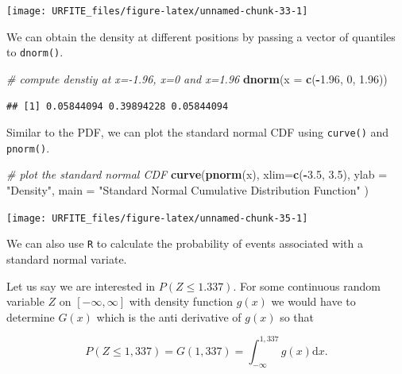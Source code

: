 \documentclass[]{book}
\newenvironment{Shaded}{\begin{snugshade}}{\end{snugshade}}
\newcommand{\KeywordTok}[1]{\textcolor[rgb]{0.13,0.29,0.53}{\textbf{#1}}}
\newcommand{\DataTypeTok}[1]{\textcolor[rgb]{0.13,0.29,0.53}{#1}}
\newcommand{\DecValTok}[1]{\textcolor[rgb]{0.00,0.00,0.81}{#1}}
\newcommand{\FloatTok}[1]{\textcolor[rgb]{0.00,0.00,0.81}{#1}}
\newcommand{\StringTok}[1]{\textcolor[rgb]{0.31,0.60,0.02}{#1}}
\newcommand{\CommentTok}[1]{\textcolor[rgb]{0.56,0.35,0.01}{\textit{#1}}}
\newcommand{\OperatorTok}[1]{\textcolor[rgb]{0.81,0.36,0.00}{\textbf{#1}}}
\newcommand{\NormalTok}[1]{#1}
\theoremstyle{definition}
\theoremstyle{definition}
\theoremstyle{definition}
\theoremstyle{remark}
\begin{document}
\begin{center}\texttt{[image: URFITE\_files/figure-latex/unnamed-chunk-33-1]} \end{center}

We can obtain the density at different positions by passing a vector of
quantiles to \texttt{dnorm()}.

\begin{Shaded}
\begin{Highlighting}[]
\CommentTok{# compute denstiy at x=-1.96, x=0 and x=1.96}
\KeywordTok{dnorm}\NormalTok{(}\DataTypeTok{x =} \KeywordTok{c}\NormalTok{(}\OperatorTok{-}\FloatTok{1.96}\NormalTok{, }\DecValTok{0}\NormalTok{, }\FloatTok{1.96}\NormalTok{))}
\end{Highlighting}
\end{Shaded}

\begin{verbatim}
## [1] 0.05844094 0.39894228 0.05844094
\end{verbatim}

Similar to the PDF, we can plot the standard normal CDF using
\texttt{curve()} and \texttt{pnorm()}.

\begin{Shaded}
\begin{Highlighting}[]
\CommentTok{# plot the standard normal CDF}
\KeywordTok{curve}\NormalTok{(}\KeywordTok{pnorm}\NormalTok{(x), }
      \DataTypeTok{xlim=}\KeywordTok{c}\NormalTok{(}\OperatorTok{-}\FloatTok{3.5}\NormalTok{, }\FloatTok{3.5}\NormalTok{), }
      \DataTypeTok{ylab =} \StringTok{"Density"}\NormalTok{, }
      \DataTypeTok{main =} \StringTok{"Standard Normal Cumulative Distribution Function"}
\NormalTok{      )}
\end{Highlighting}
\end{Shaded}

\begin{center}\texttt{[image: URFITE\_files/figure-latex/unnamed-chunk-35-1]} \end{center}

We can also use \texttt{R} to calculate the probability of events
associated with a standard normal variate.

Let us say we are interested in \(P(Z \leq 1.337)\). For some continuous
random variable \(Z\) on \([-\infty,\infty]\) with density function
\(g(x)\) we would have to determine \(G(x)\) which is the anti
derivative of \(g(x)\) so that

\[ P(Z \leq 1,337 ) = G(1,337) = \int_{-\infty}^{1,337} g(x) \mathrm{d}x.  \]
\end{document}
